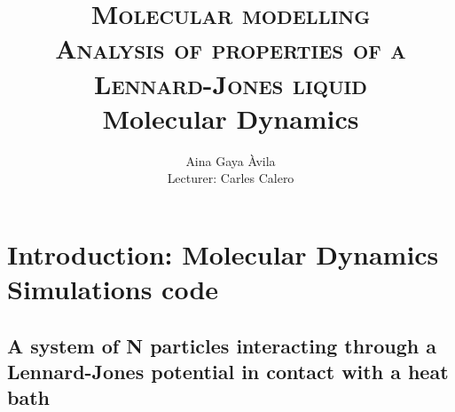 \documentclass[a4paper,10pt]{article}
\title{\textsc{{\large Molecular modelling } \\ Analysis of properties of a Lennard-Jones liquid } \\  {\small Molecular Dynamics}}
\author{Aina Gaya Àvila \\ {\small Lecturer: Carles Calero }}
\begin{document}
		
\maketitle

\section{Introduction: Molecular Dynamics Simulations code}
\subsection{A system of N particles interacting through a Lennard-Jones potential in contact with a heat bath} 
\end{document}
